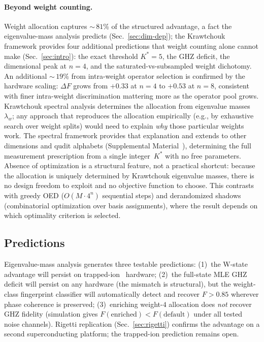 \documentclass[twocolumn,prx,aps,superscriptaddress,longbibliography,floatfix]{revtex4-2}
\begin{document}
\paragraph{Beyond weight counting.}
Weight allocation captures ${\sim}\,81$\% of the structured
advantage, a fact the eigenvalue-mass analysis predicts
(Sec.~\ref{sec:dim-dep}); the Krawtchouk framework provides
four additional predictions that weight counting alone cannot make
(Sec.~\ref{sec:intro}): the exact threshold $K^* = 5$, the GHZ
deficit, the dimensional peak at $n = 4$, and the
saturated-vs-subsampled weight dichotomy.
An additional ${\sim}\,19$\% from intra-weight operator selection
is confirmed by the hardware scaling: $\Delta F$ grows from $+0.33$
at $n = 4$ to $+0.53$ at $n = 8$, consistent with finer
intra-weight discrimination mattering more as the operator pool
grows.
Krawtchouk spectral analysis determines the allocation from
eigenvalue masses $\lambda_w$; any approach that reproduces the
allocation empirically (e.g., by exhaustive search over weight
splits) would need to explain \emph{why} those particular weights
work.  The spectral framework provides that explanation and extends
to other dimensions and qudit alphabets (Supplemental Material~\cite{supplemental}), determining
the full measurement prescription from a single integer~$K^*$ with
no free parameters.
Absence of optimization is a structural feature, not a
practical shortcut: because the allocation is uniquely determined
by Krawtchouk eigenvalue masses, there is no design freedom to
exploit and no objective function to choose.
This contrasts with greedy OED ($O(M \cdot 4^n)$ sequential steps)
and derandomized shadows (combinatorial optimization over basis
assignments), where the result depends on which optimality
criterion is selected.

\subsection{Predictions}
\label{sec:predictions}

Eigenvalue-mass analysis generates three testable predictions:
(1)~the W-state advantage will persist on
trapped-ion~\cite{Haffner2005,Wright2019} hardware;
(2)~the full-state MLE GHZ deficit will persist on any hardware
(the mismatch is structural), but the weight-class fingerprint
classifier will automatically detect and recover
$F > 0.85$ wherever phase coherence is preserved;
(3)~enriching weight-$4$ allocation does \emph{not} recover GHZ
fidelity (simulation gives
$F(\text{enriched}) < F(\text{default})$ under all tested noise
channels).
Rigetti replication (Sec.~\ref{sec:rigetti}) confirms the
advantage on a second superconducting platform; the trapped-ion
prediction remains open.
\end{document}
